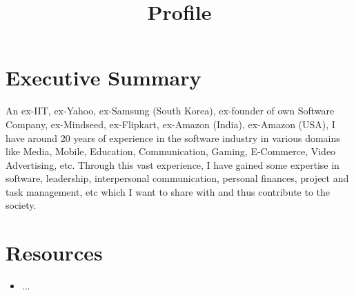 \documentclass[11pt,a4paper,sans]{moderncv} %
\title{Profile}
\begin{document}
\makecvtitle %

\section{Executive Summary}
An ex-IIT, ex-Yahoo, ex-Samsung (South Korea), ex-founder of own Software Company, ex-Mindseed, ex-Flipkart, ex-Amazon (India), ex-Amazon (USA), I have around 20 years of experience in the software industry in various domains like Media, Mobile, Education, Communication, Gaming, E-Commerce, Video Advertising, etc. Through this vast experience, I have gained some expertise in software, leadership, interpersonal communication, personal finances, project and task management, etc which I want to share with and thus contribute to the society.

\section{Resources}
  \begin{itemize}
    \item ...
  \end{itemize}
\end{document}
